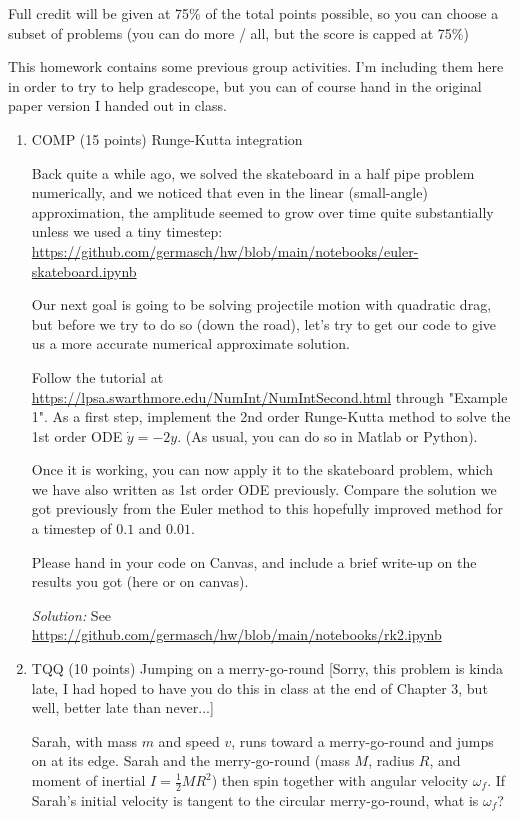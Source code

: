 \documentclass[12pt]{article}
\newcommand{\soln}[2] {\textit{Solution:} #2}
\begin{document}
Full credit will be given at 75\% of the total points possible, so you can choose a subset of problems (you can do more / all, but the score is capped at 75\%)

This homework contains some previous group activities. I'm including them here in order to try to help gradescope, but you can of course hand in the original paper version I handed out in class.

\clearpage

\begin{enumerate}

    \item COMP (15 points) Runge-Kutta integration

          Back quite a while ago, we solved the skateboard in a half pipe problem numerically, and we noticed that even in the linear (small-angle) approximation, the amplitude seemed to grow over time quite substantially unless we used a tiny timestep: \url{https://github.com/germasch/hw/blob/main/notebooks/euler-skateboard.ipynb}

          Our next goal is going to be solving projectile motion with quadratic drag, but before we try to do so (down the road), let's try to get our code to give us a more accurate numerical approximate solution.

          Follow the tutorial at \url{https://lpsa.swarthmore.edu/NumInt/NumIntSecond.html} through "Example 1". As a first step, implement the 2nd order Runge-Kutta method to solve the 1st order ODE $\dot y = -2 y$. (As usual, you can do so in Matlab or Python).

          Once it is working, you can now apply it to the skateboard problem, which we have also written as 1st order ODE previously. Compare the solution we got previously from the Euler method to this hopefully improved method for a timestep of $0.1$ and $0.01$.

          Please hand in your code on Canvas, and include a brief write-up on the results you got (here or on canvas).

          \soln{15em}{See \url{https://github.com/germasch/hw/blob/main/notebooks/rk2.ipynb}}

          \clearpage
    \item TQQ (10 points) Jumping on a merry-go-round [Sorry, this problem is kinda late, I had hoped to have you do this in class at the end of Chapter 3, but well, better late than never...]

          Sarah, with mass $m$ and speed $v$, runs toward a merry-go-round and jumps on at its edge. Sarah and the merry-go-round (mass $M$, radius $R$, and moment of inertial $I = \frac{1}{2}MR^2$) then spin together with angular velocity $\omega_f$. If Sarah's initial velocity is tangent to the circular merry-go-round, what is $\omega_f$?


\end{enumerate}
\end{document}
